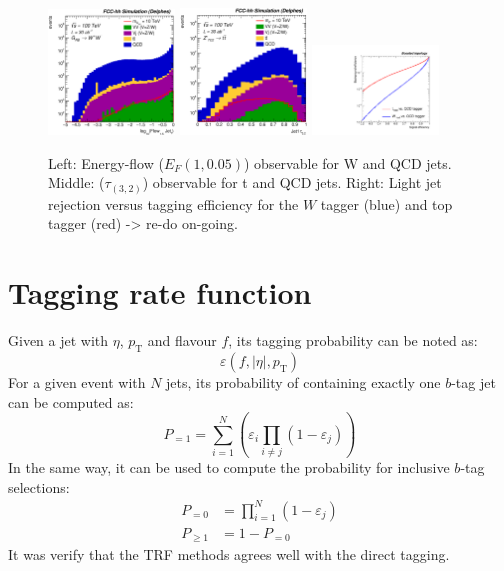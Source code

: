 \documentclass[a4paper,11pt]{article}
\newcommand{\pt}{\ensuremath{p_{\text{T}}}}
\begin{document}
\begin{figure}[!htbp]\centering
\includegraphics[width=0.3\textwidth]{Fig/TMVA/Jet1_Flow15_sel0_nostack_logx.eps}
\includegraphics[width=0.3\textwidth]{Fig/TMVA/Jet1_tau32_sel0_nostack_log.eps}
\includegraphics[width=0.3\textwidth,trim={0 0.5cm 0 0},clip]{Fig/TMVA/effQCD_vs_effWhadBlue_thadRed_log.pdf}
\caption{Left: Energy-flow ($E_{F}(1,0.05)$) observable for W and QCD jets. Middle: ($\tau_(3,2)$) observable for t and QCD jets. Right: Light jet rejection versus tagging efficiency for the $W$ tagger (blue) and top tagger (red) -> re-do on-going.}
\label{fig:TMVA_final_result}
\end{figure}


\section{Tagging rate function}
\label{sec:app:trf}
Given a jet with $\eta$, $\pt$ and flavour $f$, its tagging probability can be noted as:
\begin{equation*}
	\varepsilon \left(f,|\eta|,\pt\right)
\end{equation*}
\newline
For a given event with $N$ jets, its probability of containing exactly one $b$-tag jet can be computed as:
\begin{equation*}
	P_{=1} = \sum\limits_{i=1}^N \left( \varepsilon_{i} \prod\limits_{i \neq j} \left( 1 - \varepsilon_{j} \right) \right)
\end{equation*}
\newline
In the same way, it can be used to compute the probability for inclusive $b$-tag selections:
\begin{align*}
	P_{=0} &= \prod\limits_{i=1}^N \left( 1 - \varepsilon_{j} \right) \\
	P_{\geq 1} &= 1 - P_{=0}
\end{align*}
\newline
It was verify that the TRF methods agrees well with the direct tagging.
\end{document}
